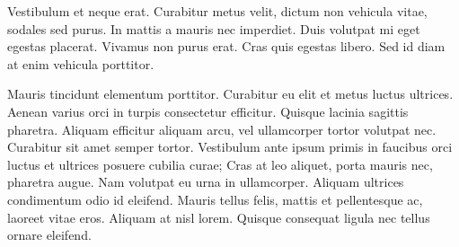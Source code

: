 Vestibulum et neque erat.
Curabitur metus velit, dictum non vehicula vitae, sodales sed purus.
In mattis a mauris nec imperdiet.
Duis volutpat mi eget egestas placerat.
Vivamus non purus erat.
Cras quis egestas libero.
Sed id diam at enim vehicula porttitor.

Mauris tincidunt elementum porttitor.
Curabitur eu elit et metus luctus ultrices.
Aenean varius orci in turpis consectetur efficitur.
Quisque lacinia sagittis pharetra.
Aliquam efficitur aliquam arcu, vel ullamcorper tortor volutpat nec.
Curabitur sit amet semper tortor.
Vestibulum ante ipsum primis in faucibus orci luctus et ultrices posuere cubilia
curae; Cras at leo aliquet, porta mauris nec, pharetra augue.
Nam volutpat eu urna in ullamcorper.
Aliquam ultrices condimentum odio id eleifend.
Mauris tellus felis, mattis et pellentesque ac, laoreet vitae eros.
Aliquam at nisl lorem.
Quisque consequat ligula nec tellus ornare eleifend.

